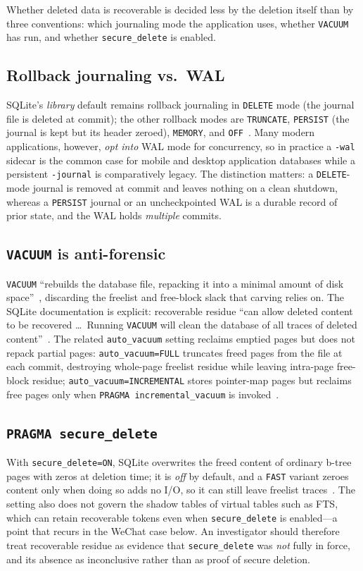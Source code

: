 \documentclass[10pt,a4paper]{article}
\newcommand{\code}[1]{\texttt{#1}}
\begin{document}
Whether deleted data is recoverable is decided less by the deletion itself than by
three conventions: which journaling mode the application uses, whether \code{VACUUM}
has run, and whether \code{secure\_delete} is enabled.

\subsection*{Rollback journaling vs.\ WAL}
SQLite's \emph{library} default remains rollback journaling in \code{DELETE} mode
(the journal file is deleted at commit); the other rollback modes are
\code{TRUNCATE}, \code{PERSIST} (the journal is kept but its header zeroed),
\code{MEMORY}, and \code{OFF}~\cite{sqlite_pragma}. Many modern applications,
however, \emph{opt into} WAL mode for concurrency, so in practice a \code{-wal}
sidecar is the common case for mobile and desktop application databases while a
persistent \code{-journal} is comparatively legacy. The distinction matters: a
\code{DELETE}-mode journal is removed at commit and leaves nothing on a clean
shutdown, whereas a \code{PERSIST} journal or an uncheckpointed WAL is a durable
record of prior state, and the WAL holds \emph{multiple} commits.

\subsection*{\code{VACUUM} is anti-forensic}
\code{VACUUM} ``rebuilds the database file, repacking it into a minimal amount of
disk space''~\cite{sqlite_vacuum}, discarding the freelist and free-block slack that
carving relies on. The SQLite documentation is explicit: recoverable residue
``can allow deleted content to be recovered \dots\ Running \code{VACUUM} will clean
the database of all traces of deleted content''~\cite{sqlite_vacuum}. The related
\code{auto\_vacuum} setting reclaims emptied pages but does not repack partial
pages: \code{auto\_vacuum=FULL} truncates freed pages from the file at each commit,
destroying whole-page freelist residue while leaving intra-page free-block residue;
\code{auto\_vacuum=INCREMENTAL} stores pointer-map pages but reclaims free pages
only when \code{PRAGMA incremental\_vacuum} is invoked~\cite{sqlite_pragma}.

\subsection*{\code{PRAGMA secure\_delete}}
With \code{secure\_delete=ON}, SQLite overwrites the freed content of ordinary
b-tree pages with zeros at deletion time; it is \emph{off} by default, and a
\code{FAST} variant zeroes content only when doing so adds no I/O, so it can still
leave freelist traces~\cite{sqlite_pragma}. The setting also does not govern the
shadow tables of virtual tables such as FTS, which can retain recoverable tokens
even when \code{secure\_delete} is enabled---a point that recurs in the WeChat case
below. An investigator should therefore treat recoverable residue as evidence that
\code{secure\_delete} was \emph{not} fully in force, and its absence as
inconclusive rather than as proof of secure deletion.
\end{document}

